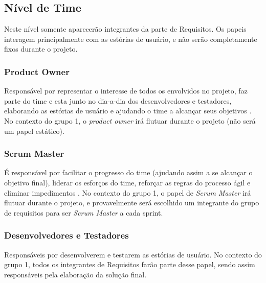 \subsection{Nível de Time}
Neste nível somente aparecerão integrantes da parte de Requisitos. Os papeis interagem principalmente com as estórias de usuário, e não serão completamente fixos durante o projeto.

\subsubsection{Product Owner}
Responsável por representar o interesse de todos os envolvidos no projeto, faz parte do time e esta junto no dia-a-dia dos desenvolvedores e testadores, elaborando as estórias de usuário e ajudando o time a alcançar seus objetivos \cite{safe008}. No contexto do grupo 1, o \emph{product owner} irá flutuar durante o projeto (não será um papel estático).

\subsubsection{Scrum Master}
É responsável por facilitar o progresso do time (ajudando assim a se alcançar o objetivo final), liderar os esforços do time, reforçar as regras do processo ágil e eliminar impedimentos \cite{safe009}. No contexto do grupo 1, o papel de \emph{Scrum Master} irá flutuar durante o projeto, e provavelmente será escolhido um integrante do grupo de requisitos para ser \emph{Scrum Master} a cada sprint.

\subsubsection{Desenvolvedores e Testadores}
Responsáveis por desenvolverem e testarem as estórias de usuário. No contexto do grupo 1, todos os integrantes de Requisitos farão parte desse papel, sendo assim responsáveis pela elaboração da solução final.